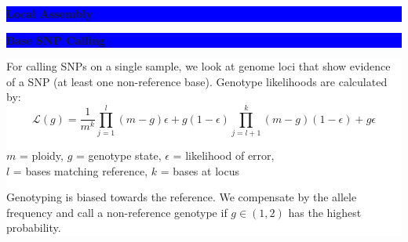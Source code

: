 \documentclass[11pt]{a0poster}
\begin{document}
{\begin{minipage}[t][2045pt][t]{\linewidth}
\begin{minipage}{0.6\linewidth}
\vspace{75pt}
\colorbox{Blue}{
\begin{minipage}[t]{\linewidth}
\vspace{30pt}
\begin{center}
\Huge \bf \color{White} Local Assembly
\end{center}
\vspace{17pt}
\end{minipage}
}
\colorbox{White}{
\begin{minipage}[t][400pt][t]{\linewidth}
\hfill
\pagebreak
\end{minipage}
}

\vspace{75pt}
\begin{minipage}{0.47\linewidth}
\colorbox{Blue}{
\begin{minipage}[t]{\linewidth}
\vspace{30pt}
\begin{center}
\Huge \bf \color{White} Base SNP Calling
\end{center}
\vspace{17pt}
\end{minipage}
}
\colorbox{White}{
\begin{minipage}[t][520pt][t]{\linewidth}
\color{Blue}
\vspace{20pt}
\LARGE For calling SNPs on a single sample, we look at genome loci that show evidence
of a SNP (at least one non-reference base). Genotype likelihoods are calculated
by:
\large$$\mathcal{L}(g)=\frac{1}{m^k}\prod_{j=1}^{l}{(m - g) \epsilon + g (1 - \epsilon)}\prod_{j=l + 1}^{k}{(m - g)(1 - \epsilon) + g \epsilon}$$
\begin{center}
\small $m$ = ploidy, $g$ = genotype state, $\epsilon$ = likelihood of error, \\
$l$ = bases matching reference, $k$ = bases at locus
\end{center}
\LARGE Genotyping is biased towards the reference. We compensate by the allele
frequency and call a non-reference genotype if $g \in (1, 2)$ has the highest probability.
\pagebreak
\end{minipage}
}
\end{minipage}
\begin{minipage}{0.06\linewidth}
\hfill
\pagebreak
\end{minipage}
\begin{minipage}{0.47\linewidth}
\colorbox{Blue}{
\begin{minipage}[t]{\linewidth}
\vspace{30pt}

\end{minipage}}
\end{minipage}
\end{minipage}
\end{minipage}}
\end{document}
